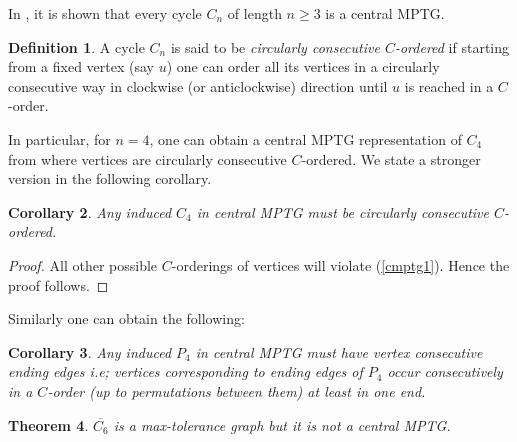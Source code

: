 \documentclass{article}
\newtheorem{thm}{Theorem}[section]
\newtheorem{cor}[thm]{Corollary}
\theoremstyle{definition}
\newtheorem{defn}[thm]{Definition}
\numberwithin{equation}{section}
\begin{document}
\noindent
In \cite{Soto}, it is shown that every cycle $C_n$ of length $n\geq 3$ is a central MPTG. 

\begin{defn}
A cycle $C_{n}$ is said to be {\em circularly consecutive $C$-ordered} if starting from a fixed vertex (say $u$) one can order all its vertices in a circularly consecutive way in clockwise (or anticlockwise) direction until $u$ is reached in a $C$-order.
\end{defn}

\noindent
In particular, for $n=4$, one can obtain a central MPTG representation of $C_{4}$ from \cite{Soto} where vertices are circularly consecutive $C$-ordered. We state a stronger version in the following corollary.

\begin{cor}  \label{c6}
Any induced $C_{4}$ in central MPTG must be circularly consecutive $C$-ordered.
\end{cor}  

\begin{proof}
All other possible $C$-orderings of vertices will violate (\ref{cmptg1}). Hence the proof follows.
\end{proof}

\noindent
Similarly one can obtain the following:

\begin{cor}
Any induced $P_{4}$ in central MPTG must have vertex consecutive ending edges i.e; vertices corresponding to ending edges of $P_{4}$ occur consecutively in a $C$-order (up to permutations between them) at least in one end.
\end{cor}

\begin{thm}\label{c61}
 $\overline{C_{6}}$ is a max-tolerance graph but it is not a central MPTG.
 \end{thm}
 
\end{document}
